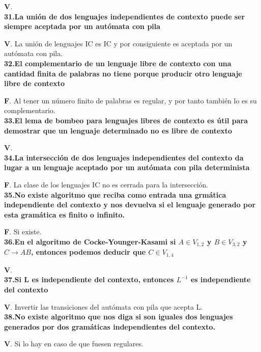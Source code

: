 \documentclass[a4paper,11pt]{article}
\begin{document}
\textbf{V}. \\

\textbf{31.La unión de dos lenguajes independientes de contexto puede ser siempre aceptada por un autómata con pila}

\textbf{V}. La unión de lenguajes IC es IC y por consiguiente es aceptada por un autómata con pila. \\

\textbf{32.El complementario de un lenguaje libre de contexto con una cantidad finita de palabras no tiene porque producir otro lenguaje libre de contexto}

\textbf{F}. Al tener un número finito de palabras es regular, y por tanto también lo es su complementario. \\

\textbf{33.El lema de bombeo para lenguajes libres de contexto es útil para demostrar que un lenguaje determinado no es libre de contexto}

\textbf{V}. \\

\textbf{34.La intersección de dos lenguajes independientes del contexto da lugar a un lenguaje aceptado por un autómata con pila determinista}

\textbf{F}. La clase de los lenguajes IC no es cerrada para la intersección. \\

\textbf{35.No existe algoritmo que reciba como entrada una grmática independiente del contexto y nos devuelva si el lenguaje generado por esta gramática es finito o infinito.}

\textbf{F}. Si existe. \\

\textbf{36.En el algoritmo de Cocke-Younger-Kasami si $A\in V_{1,2}$ y $B \in V_{3,2}$ y $C\rightarrow AB$, entonces podemos deducir que $C \in V_{1,4}$}

\textbf{V}. \\

\textbf{37.Si L es independiente del contexto, entonces $L^{-1}$ es independiente del contexto}

\textbf{V}. Invertir las transiciones del autómata con pila que acepta L. \\

\textbf{38.No existe algoritmo que nos diga si son iguales dos lenguajes generados por dos gramáticas independientes del contexto.}

\textbf{V}. Si lo hay en caso de que fuesen regulares. \\
\end{document}
